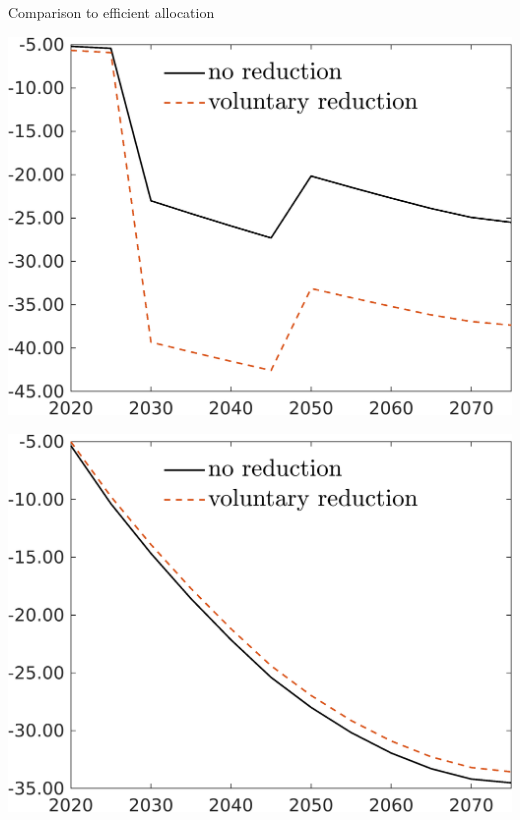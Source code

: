 \documentclass[11pt,aspectratio=169]{beamer}
\begin{document}
\begin{frame}{Comparison to efficient allocation}
\begin{minipage}[]{0.32\textwidth}
	\includegraphics[width=1\textwidth]{../codding_model/own_basedOnFried/optimalPol_elastS_DisuSci/figures/all_1705/GFF_CompEffOPT_T_NoTaus_spillover0_sep1_BN1_ineq1_redCOMP_etaa0.79_lgd1.png}
\end{minipage}
\begin{minipage}[]{0.32\textwidth}
	\includegraphics[width=1\textwidth]{../codding_model/own_basedOnFried/optimalPol_elastS_DisuSci/figures/all_1705/Ag_CompEffOPT_T_NoTaus_spillover0_sep1_BN1_ineq1_redCOMP_etaa0.79_lgd1.png}
\end{minipage}

\end{frame}
\end{document}
